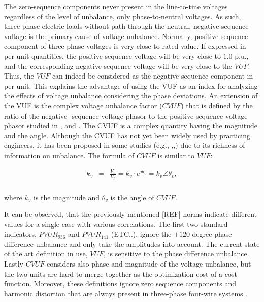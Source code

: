 	
	The zero-sequence components never present in the line-to-tine voltages regardless of the level of unbalance, only phase-to-neutral voltages. As such, three-phase electric loads without path through the neutral, negative-sequence voltage is the primary cause of voltage unbalance. Normally, positive-sequence component of three-phase voltages is very close to rated value. If expressed in per-unit quantities, the positive-sequence voltage will be very close to $1.0$ p.u., and the corresponding negative-sequence voltage will be very close to the $VUF$. Thus, the $VUF$ can indeed be considered as the negative-sequence component in per-unit.	This explains the advantage of using the VUF as an index for analyzing the effects of voltage unbalance considering the phase deviations.
	An extension of the VUF is the complex voltage unbalance factor ($CVUF$) that is defined by the ratio of the negative-
sequence voltage phasor to the positive-sequence voltage phasor studied in \cite{wang2000analytical}, and \cite{pierrat1987unbalance}. The CVUF is a complex quantity having the magnitude and the angle. Although the CVUF has not yet been widely used by practicing engineers, it has been proposed in some studies (e.g., \cite{wang2001analysis},\cite{singh2007some},\cite{chen2013examination}) due to its richness of information on unbalance. The formula of $CVUF$ is similar to $VUF$:

\begin{equation}
        \begin{array}{rcl}
            k_v&=&\frac{V_n}{V_p}=k_v\cdot e^{j\theta_v}=k_v\angle\theta_v,\\					
        \end{array}
        \label{BASICUNB:equ:CVUF}
    \end{equation}
		
		where $k_v$ is the magnitude and $\theta_v$ is the angle of $CVUF$.
		
			It can be observed, that the previously mentioned [REF] norms indicate different values for a single case with various correlations. The first two standard indicators, $PVUR_{936}$ and $PVUR_{141}$ (ETC..), ignore the $\pm120$ degree phase difference unbalance and only take the amplitudes into account. The current state of the art definition in use, $VUF$, is sensitive to the phase difference unbalance. Lastly $CVUF$ considers also phase and magnitude of the voltage unbalance, but the two units are hard to merge together as the optimization cost of a cost function. Moreover, these definitions ignore zero sequence components and harmonic distortion that are always present in three-phase four-wire systems \cite{bina2011three}.
		          
